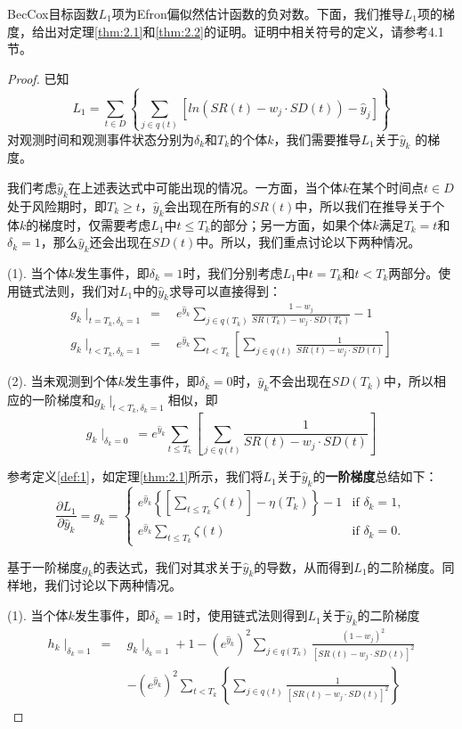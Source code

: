 BecCox目标函数$L_1$项为Efron偏似然估计函数的负对数。下面，我们推导$L_1$项的梯度，给出对定理\ref{thm:2.1}和\ref{thm:2.2}的证明。证明中相关符号的定义，请参考4.1节。
\begin{proof}
已知$$L_1 = \sum_{t\in D} \left\{ \sum_{j\in q(t)} [ln(SR(t)-w_j\cdot SD(t))-\hat{y}_j] \right\}$$ 对观测时间和观测事件状态分别为$\delta_k$和$T_k$的个体$k$，我们需要推导$L_1$关于$\hat{y}_k$ 的梯度。

我们考虑$\hat{y}_k$在上述表达式中可能出现的情况。一方面，当个体$k$在某个时间点$t\in D$处于风险期时，即$T_k\ge t$，$\hat{y}_k$会出现在所有的$SR(t)$中，所以我们在推导关于个体$k$的梯度时，仅需要考虑$L_1$中$t \le T_k$的部分；另一方面，如果个体$k$满足$T_k=t$和$\delta_k=1$，那么$\hat{y}_k$还会出现在$SD(t)$中。所以，我们重点讨论以下两种情况。

(1). 当个体$k$发生事件，即$\delta_k=1$时，我们分别考虑$L_1$中$t=T_k$和$t<T_k$两部分。使用链式法则，我们对$L_1$中的$\hat{y}_k$求导可以直接得到：\[
\begin{split}
g_k\mid_{t=T_k,\delta_k=1} \ =\ & e^{\hat{y}_k}\sum_{j\in q(T_k)} \frac{1-w_j}{SR(T_k) - w_j\cdot SD(T_k)} - 1 \\
g_k\mid_{t<T_k,\delta_k=1} \ =\ & e^{\hat{y}_k}\sum_{t<T_k}\left[\sum_{j\in q(t)} \frac{1}{SR(t) - w_j\cdot SD(t)}\right]
\end{split}
\]

(2). 当未观测到个体$k$发生事件，即$\delta_k=0$时，$\hat{y}_k$不会出现在$SD(T_k)$中，所以相应的一阶梯度和$g_k\mid_{t<T_k,\delta_k=1}$相似，即$$
g_k\mid_{\delta_k=0} \ = e^{\hat{y}_k}\sum_{t\le T_k}\left[\sum_{j\in q(t)} \frac{1}{SR(t) - w_j\cdot SD(t)}\right]
$$

参考定义\ref{def:1}，如定理\ref{thm:2.1}所示，我们将$L_1$关于$\hat{y}_k$的\textbf{一阶梯度}总结如下：$$
\frac{\partial L_1}{\partial \hat{y}_k} = g_k = 
\begin{cases}
e^{\hat{y}_k} \left\{ \left[\sum_{t\le T_k} \zeta(t)\right] - \eta(T_k) \right\} - 1 & \text{if } \delta_k = 1,\\
e^{\hat{y}_k} \sum_{t\le T_k} \zeta(t) & \text{if } \delta_k = 0.
\end{cases}
$$

基于一阶梯度$g_k$的表达式，我们对其求关于$\hat{y}_k$的导数，从而得到$L_1$的二阶梯度。同样地，我们讨论以下两种情况。

(1). 当个体$k$发生事件，即$\delta_k=1$时，使用链式法则得到$L_1$关于$\hat{y}_k$的二阶梯度\[
\begin{split}
h_k\mid_{\delta_k=1}\ =\ & g_k\mid_{\delta_k=1} + 1 - (e^{\hat{y}_k})^2 \sum_{j\in q(T_k)} \frac{(1-w_j)^2}{[SR(t) - w_j\cdot SD(t)]^2} \\
   & -(e^{\hat{y}_k})^2 \sum_{t< T_k}\left\{\sum_{j\in q(t)} \frac{1}{[SR(t) - w_j\cdot SD(t)]^2}\right\}
\end{split}
\]


\end{proof}
